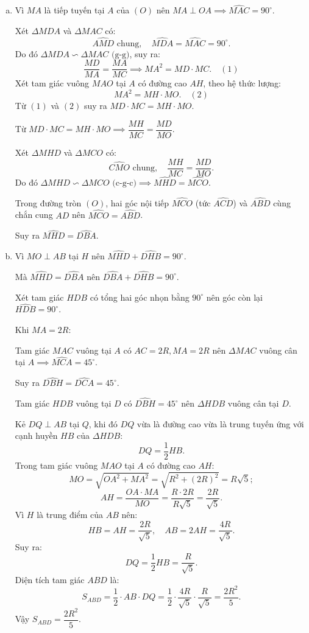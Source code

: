 \begin{bt}
{\begin{enumerate}[a)]
			Tứ giác $MDHA$ có $\widehat{ADM} = \widehat{MHA} = 90^\circ$, do đó hai đỉnh kề nhau $D$ và $H$ cùng nhìn đoạn $MA$ dưới góc vuông.
			
			Suy ra tứ giác $MDHA$ nội tiếp đường tròn đường kính $MA$.
			\item Vì $MA$ là tiếp tuyến tại $A$ của $(O)$ nên $MA \perp OA \implies \widehat{MAC} = 90^\circ$.
			
			Xét $\Delta MDA$ và $\Delta MAC$ có:
			$$\widehat{AMD}\text{ chung},\quad \widehat{MDA} = \widehat{MAC} = 90^\circ.$$
			Do đó $\Delta MDA \backsim \Delta MAC\text{ (g-g)}$, suy ra:
			$$\dfrac{MD}{MA} = \dfrac{MA}{MC} \implies MA^2 = MD \cdot MC. \quad (1)$$
			Xét tam giác vuông $MAO$ tại $A$ có đường cao $AH$, theo hệ thức lượng:
			$$MA^2 = MH \cdot MO. \quad (2)$$
			Từ $(1)$ và $(2)$ suy ra $MD \cdot MC = MH \cdot MO$.
			
			Từ $MD \cdot MC = MH \cdot MO \implies \dfrac{MH}{MC} = \dfrac{MD}{MO}$.
			
			Xét $\Delta MHD$ và $\Delta MCO$ có:
			$$\widehat{CMO}\text{ chung},\quad \dfrac{MH}{MC} = \dfrac{MD}{MO}.$$
			Do đó $\Delta MHD \backsim \Delta MCO\text{ (c-g-c)} \implies \widehat{MHD} = \widehat{MCO}$.
			
			Trong đường tròn $(O)$, hai góc nội tiếp $\widehat{MCO}$ (tức $\widehat{ACD}$) và $\widehat{ABD}$ cùng chắn cung $AD$ nên $\widehat{MCO} = \widehat{ABD}$.
			
			Suy ra $\widehat{MHD} = \widehat{DBA}$.
			\item Vì $MO \perp AB$ tại $H$ nên $\widehat{MHD} + \widehat{DHB} = 90^\circ$.
			
			Mà $\widehat{MHD} = \widehat{DBA}$ nên $\widehat{DBA} + \widehat{DHB} = 90^\circ$.
			
			Xét tam giác $HDB$ có tổng hai góc nhọn bằng $90^\circ$ nên góc còn lại $\widehat{HDB} = 90^\circ$.
			
			Khi $MA = 2R$:
			
			Tam giác $MAC$ vuông tại $A$ có $AC = 2R, MA = 2R$ nên $\Delta MAC$ vuông cân tại $A \implies \widehat{MCA} = 45^\circ$.
			
			Suy ra $\widehat{DBH} = \widehat{DCA} = 45^\circ$.
			
			Tam giác $HDB$ vuông tại $D$ có $\widehat{DBH} = 45^\circ$ nên $\Delta HDB$ vuông cân tại $D$.
			
			Kẻ $DQ \perp AB$ tại $Q$, khi đó $DQ$ vừa là đường cao vừa là trung tuyến ứng với cạnh huyền $HB$ của $\Delta HDB$:
			$$DQ = \dfrac{1}{2}HB.$$
			Trong tam giác vuông $MAO$ tại $A$ có đường cao $AH$:
			$$MO = \sqrt{OA^2 + MA^2} = \sqrt{R^2 + (2R)^2} = R\sqrt{5};$$
			$$AH = \dfrac{OA \cdot MA}{MO} = \dfrac{R \cdot 2R}{R\sqrt{5}} = \dfrac{2R}{\sqrt{5}}.$$
			Vì $H$ là trung điểm của $AB$ nên:
			$$HB = AH = \dfrac{2R}{\sqrt{5}},\quad AB = 2AH = \dfrac{4R}{\sqrt{5}}.$$
			Suy ra:
			$$DQ = \dfrac{1}{2}HB = \dfrac{R}{\sqrt{5}}.$$
			Diện tích tam giác $ABD$ là:
			$$S_{ABD} = \dfrac{1}{2} \cdot AB \cdot DQ = \dfrac{1}{2} \cdot \dfrac{4R}{\sqrt{5}} \cdot \dfrac{R}{\sqrt{5}} = \dfrac{2R^2}{5}.$$
			Vậy $S_{ABD} = \dfrac{2R^2}{5}$.
		\end{enumerate}
	}
\end{bt}
